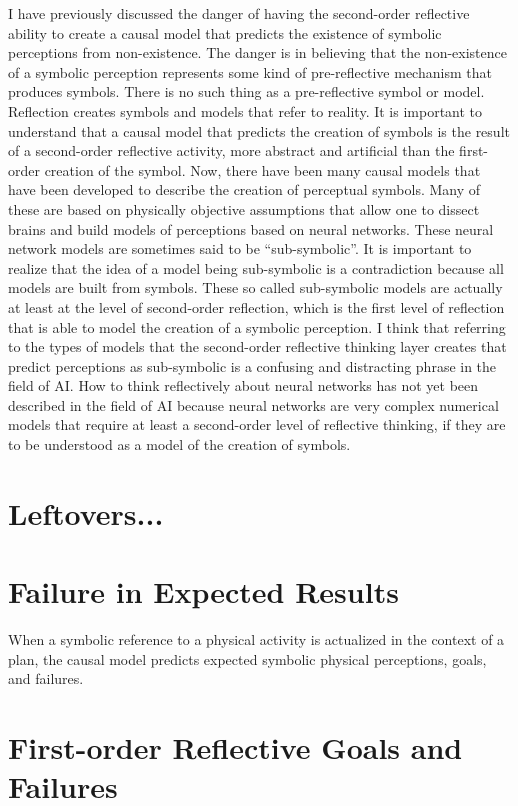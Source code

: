 I have previously discussed the danger of having the second-order
reflective ability to create a causal model that predicts the
existence of symbolic perceptions from non-existence.  The danger is
in believing that the non-existence of a symbolic perception
represents some kind of pre-reflective mechanism that produces
symbols.  There is no such thing as a pre-reflective symbol or model.
Reflection creates symbols and models that refer to reality.  It is
important to understand that a causal model that predicts the creation
of symbols is the result of a second-order reflective activity, more
abstract and artificial than the first-order creation of the symbol.
Now, there have been many causal models that have been developed to
describe the creation of perceptual symbols.  Many of these are based
on physically objective assumptions that allow one to dissect brains
and build models of perceptions based on neural networks.  These
neural network models are sometimes said to be ``sub-symbolic''.  It
is important to realize that the idea of a model being sub-symbolic is
a contradiction because all models are built from symbols.  These so
called sub-symbolic models are actually at least at the level of
second-order reflection, which is the first level of reflection that
is able to model the creation of a symbolic perception.  I think that
referring to the types of models that the second-order reflective
thinking layer creates that predict perceptions as sub-symbolic is a
confusing and distracting phrase in the field of AI.  How to think
reflectively about neural networks has not yet been described in the
field of AI because neural networks are very complex numerical models
that require at least a second-order level of reflective thinking, if
they are to be understood as a model of the creation of symbols.

\section{Leftovers...}

\section{Failure in Expected Results}

When a symbolic reference to a physical activity is actualized in the
context of a plan, the causal model predicts expected symbolic
physical perceptions, goals, and failures.

\section{First-order Reflective Goals and Failures}

